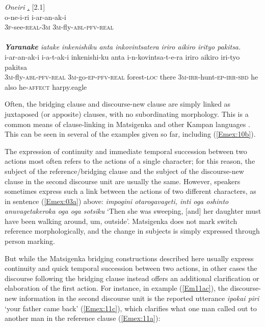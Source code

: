 \documentclass[output=paper]{LSP/langsci}
\begin{document}
\begin{exe}
\ex \label{Em10ab}
\begin{xlist}
\ex \label{Emex:10a}
\glt \textit{Oneiri \underline{.}} [2.1]\\
\gll o-ne-i-ri i-ar-an-ak-i\\
 \textsc{3f-}see\textsc{-real-3m} \textsc{3m-}fly\textsc{-abl-pfv-real}\\
\glt {}\\
\ex \label{Emex:10b}
\glt \textit{\textbf{Yaranake} iatake inkenishiku anta inkovintsatera iriro aikiro irityo pakitsa.}\\
\gll i-ar-an-ak-i i-a-t-ak-i inkenishi-ku anta i-n-kovintsa-t-e-ra iriro aikiro iri-tyo pakitsa\\     	      
   \textsc{3m-}fly\textsc{-abl-pfv-real} \textsc{3m-}go\textsc{-ep-pfv-real} forest\textsc{-loc} there \textsc{3m-irr-}hunt\textsc{-ep-irr-sbd} he also he\textsc{-affect} harpy.eagle\\
\glt {}
\end{xlist}
\end{exe}



Often, the bridging clause and discourse-new clause are simply linked as juxtaposed (or apposite) clauses, with no subordinating morphology. This is a common means of clause-linking in Matsigenka and other Kampan languages \citep[e.g.,][435]{michael08}. This can be seen in several of the examples given so far, including (\ref{Emex:10b}).

The expression of continuity and immediate temporal succession between two actions most often refers to the actions of a single character; for this reason, the subject of the reference/bridging clause and the subject of the discourse-new clause in the second discourse unit are usually the same. However, speakers sometimes express such a link between the actions of two different characters, as in sentence (\ref{Emex:03a}) above: \textit{impogini otarogavageti, inti oga oshinto anuvagetakeroka oga oga sotsiku} `Then she was sweeping, [and] her daughter must have been walking around, um, outside'. Matsigenka does not mark switch reference morphologically, and the change in subjects is simply expressed through person marking. 

But while the Matsigenka bridging constructions described here usually express continuity and quick temporal succession between two actions, in other cases the discourse following the bridging clause instead offers an additional clarification or elaboration of the first action. For instance, in example (\ref{Em11ac}), the discourse-new information in the second discourse unit is the reported utterance \textit{ipokai piri} `your father came back' (\ref{Emex:11c}), which clarifies what one man called out to another man in the reference clause (\ref{Emex:11a}):
\end{document}
